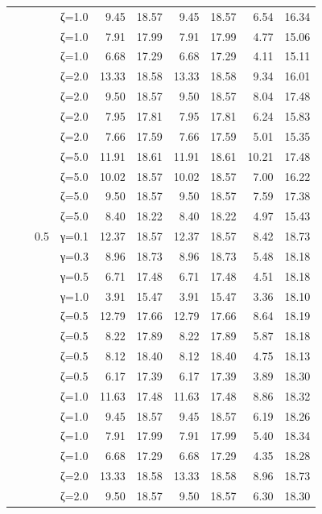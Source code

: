 \begin{table}[htbp]
\begin{tabular}{ll r l  rr  rr  rr}
  &  &  & ζ=1.0 & 9.45 & 18.57 & 9.45 & 18.57 & 6.54 & 16.34 \\
  &  &  & ζ=1.0 & 7.91 & 17.99 & 7.91 & 17.99 & 4.77 & 15.06 \\
  &  &  & ζ=1.0 & 6.68 & 17.29 & 6.68 & 17.29 & 4.11 & 15.11 \\
  &  &  & ζ=2.0 & 13.33 & 18.58 & 13.33 & 18.58 & 9.34 & 16.01 \\
  &  &  & ζ=2.0 & 9.50 & 18.57 & 9.50 & 18.57 & 8.04 & 17.48 \\
  &  &  & ζ=2.0 & 7.95 & 17.81 & 7.95 & 17.81 & 6.24 & 15.83 \\
  &  &  & ζ=2.0 & 7.66 & 17.59 & 7.66 & 17.59 & 5.01 & 15.35 \\
  &  &  & ζ=5.0 & 11.91 & 18.61 & 11.91 & 18.61 & 10.21 & 17.48 \\
  &  &  & ζ=5.0 & 10.02 & 18.57 & 10.02 & 18.57 & 7.00 & 16.22 \\
  &  &  & ζ=5.0 & 9.50 & 18.57 & 9.50 & 18.57 & 7.59 & 17.38 \\
  &  &  & ζ=5.0 & 8.40 & 18.22 & 8.40 & 18.22 & 4.97 & 15.43 \\
  &  & 0.5 & γ=0.1 & 12.37 & 18.57 & 12.37 & 18.57 & 8.42 & 18.73 \\
  &  &  & γ=0.3 & 8.96 & 18.73 & 8.96 & 18.73 & 5.48 & 18.18 \\
  &  &  & γ=0.5 & 6.71 & 17.48 & 6.71 & 17.48 & 4.51 & 18.18 \\
  &  &  & γ=1.0 & 3.91 & 15.47 & 3.91 & 15.47 & 3.36 & 18.10 \\
  &  &  & ζ=0.5 & 12.79 & 17.66 & 12.79 & 17.66 & 8.64 & 18.19 \\
  &  &  & ζ=0.5 & 8.22 & 17.89 & 8.22 & 17.89 & 5.87 & 18.18 \\
  &  &  & ζ=0.5 & 8.12 & 18.40 & 8.12 & 18.40 & 4.75 & 18.13 \\
  &  &  & ζ=0.5 & 6.17 & 17.39 & 6.17 & 17.39 & 3.89 & 18.30 \\
  &  &  & ζ=1.0 & 11.63 & 17.48 & 11.63 & 17.48 & 8.86 & 18.32 \\
  &  &  & ζ=1.0 & 9.45 & 18.57 & 9.45 & 18.57 & 6.19 & 18.26 \\
  &  &  & ζ=1.0 & 7.91 & 17.99 & 7.91 & 17.99 & 5.40 & 18.34 \\
  &  &  & ζ=1.0 & 6.68 & 17.29 & 6.68 & 17.29 & 4.35 & 18.28 \\
  &  &  & ζ=2.0 & 13.33 & 18.58 & 13.33 & 18.58 & 8.96 & 18.73 \\
  &  &  & ζ=2.0 & 9.50 & 18.57 & 9.50 & 18.57 & 6.30 & 18.30 \\

\end{tabular}
\end{table}
